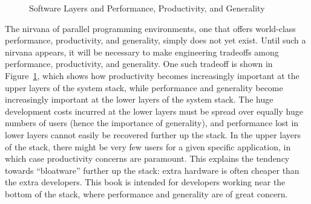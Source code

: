 \begin{figure}[tb]
\centering
{}
\caption{Software Layers and Performance, Productivity, and Generality}
\label{fig:intro:Software Layers and Performance, Productivity, and Generality}
\end{figure}

The nirvana of parallel programming environments, one that offers
world-class performance, productivity, and generality, simply does
not yet exist.
Until such a nirvana appears, it will be necessary to make engineering
tradeoffs among performance, productivity, and generality.
One such tradeoff is shown in
Figure~\ref{fig:intro:Software Layers and Performance, Productivity, and Generality},
which shows how productivity becomes increasingly important at the upper layers
of the system stack,
while performance and generality become increasingly important at the
lower layers of the system stack.
The huge development costs incurred at the lower layers
must be spread over equally huge numbers of users
(hence the importance of generality), and
performance lost in lower layers cannot easily be
recovered further up the stack.
In the upper layers of the stack, there might be very few users for a given
specific application, in which case productivity concerns are paramount.
This explains the tendency towards ``bloatware'' further up the stack:
extra hardware is often cheaper than the extra developers.
This book is intended for developers working near the bottom
of the stack, where performance and generality are of great concern.

